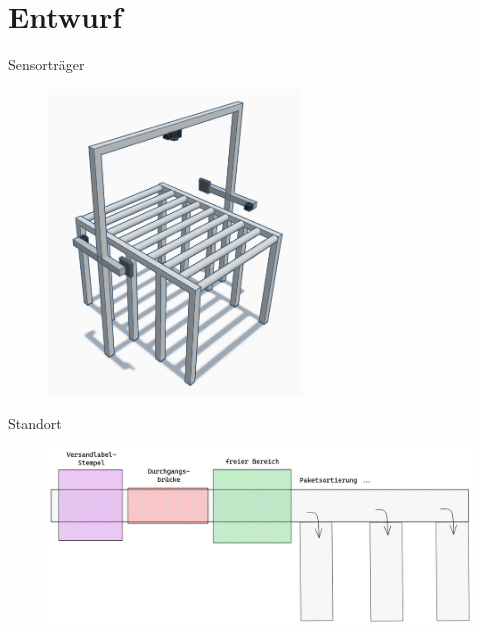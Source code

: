 \documentclass[10pt,ngerman]{beamer}
\begin{document}
\section{Entwurf}
\begin{frame}[fragile]{Sensorträger}
  \begin{figure}[htpb]
    \centering
    \includegraphics[width=0.6\textwidth]{files/Sensortraeger/Skizze_Sensor_Traeger_3D_verdreht_cropped.png}
  \end{figure}
\end{frame}



\begin{frame}[fragile]{Standort}
  \begin{figure}[htpb]
    \centering
    \includegraphics[width=1\textwidth]{pics/Versandanlage.png}
  \end{figure}
\end{frame}
\end{document}
